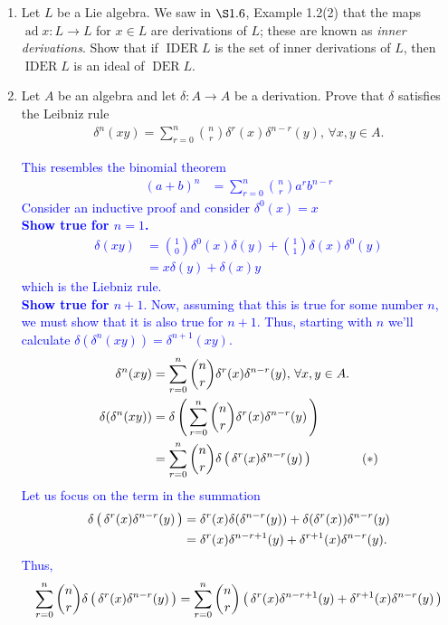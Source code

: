 \documentclass[12pt,a4paper]{report}
\newcommand{\BLUE}[1]{\textcolor{blue}{#1}}
\begin{document}
\begin{enumerate}[label=\textit{1.\arabic*}]
\item Let $L$ be a Lie algebra.  We saw in $\S1.6$, Example 1.2(2) that the maps $\operatorname{ad} x: L \to L$ for $x \in L$ are derivations of $L$; these are known as \textit{inner derivations}.  Show that if $\operatorname{IDER} L$ is the set of inner derivations of $L$, then $\operatorname{IDER} L$ is an ideal of $\operatorname{DER} L$.

\item Let $A$ be an algebra and let $\delta : A \to A$ be a derivation.  Prove that $\delta$ satisfies the Leibniz rule
\begin{align*}
	\delta^n(xy) = \sum_{r=0}^n\binom{n}{r}\delta^r(x)\delta^{n-r}(y),\, \forall x,y \in A.
\end{align*}

\BLUE{This resembles the binomial theorem
\begin{align*}
	(a+b)^n &= \sum_{r=0}^n \binom{n}{r}a^rb^{n-r}
\end{align*}Consider an inductive proof and consider $\delta^0(x) = x$\\
\textbf{Show true for $n=1$.}
\begin{align*}
	\delta(xy) &= \binom{1}{0} \delta^0(x)\delta(y)+\binom{1}{1}\delta(x)\delta^0(y) \\
	&= x\delta(y)+\delta(x)y
\end{align*}which is the Liebniz rule.  \\
\textbf{Show true for $n+1$}.  Now, assuming that this is true for some number $n$, we must show that it is also true for $n+1$.  Thus, starting with $n$ we'll calculate $\delta(\delta^n(xy)) = \delta^{n+1}(xy)$.
\begin{align*}
	\delta^n(xy) &= \sum_{r=0}^n\binom{n}{r}\delta^r(x)\delta^{n-r}(y),\, \forall x,y \in A. \\
	\delta(\delta^n(xy)) &= \delta\left (\, \sum_{r=0}^n\binom{n}{r}\delta^r(x)\delta^{n-r}(y) \,\right ) \\
	&= \sum_{r=0}^n\binom{n}{r}\delta\left (\, \delta^r(x)\delta^{n-r}(y)  \,\right ) &(*)
\end{align*}Let us focus on the term in the summation
\begin{align*}
	\delta\left (\, \delta^r(x)\delta^{n-r}(y)  \,\right ) &= \delta^r(x)\delta(\delta^{n-r}(y))+\delta(\delta^r(x))\delta^{n-r}(y) \\
	&= \delta^r(x)\delta^{n-r+1}(y) + \delta^{r+1}(x)\delta^{n-r}(y).
\end{align*}Thus, 
\begin{align*}
	\sum_{r=0}^n\binom{n}{r}\delta\PAREN{\delta^r(x)\delta^{n-r}(y) } &= \sum_{r=0}^n\binom{n}{r}\PAREN{\delta^r(x)\delta^{n-r+1}(y) + \delta^{r+1}(x)\delta^{n-r}(y) } \\

\end{align*}}
\end{enumerate}
\end{document}
